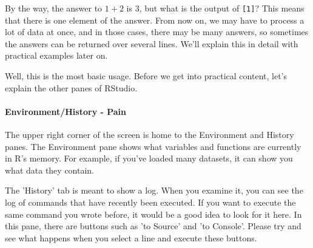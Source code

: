 \documentclass{ltjsbook}
\begin{document}
By the way, the answer to $1+2$ is $3$, but what is the output of \verb|[1]|? This means that there is one element of the answer. From now on, we may have to process a lot of data at once, and in those cases, there may be many answers, so sometimes the answers can be returned over several lines. We'll explain this in detail with practical examples later on.

Well, this is the most basic usage. Before we get into practical content, let's explain the other panes of RStudio.
\paragraph{Environment/History - Pain}
The upper right corner of the screen is home to the Environment and History panes. The Environment pane shows what variables and functions are currently in R's memory. For example, if you've loaded many datasets, it can show you what data they contain.

The 'History' tab is meant to show a log. When you examine it, you can see the log of commands that have recently been executed. If you want to execute the same command you wrote before, it would be a good idea to look for it here. In this pane, there are buttons such as 'to Source' and 'to Console'. Please try and see what happens when you select a line and execute these buttons.
\end{document}
